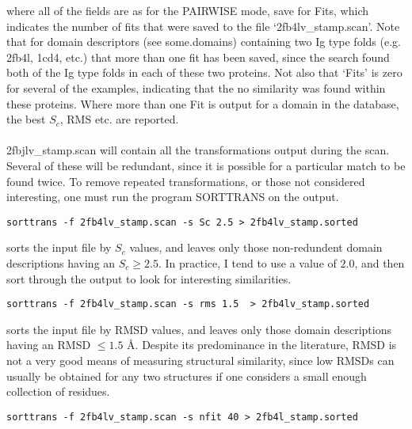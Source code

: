 where all of the fields are as for the PAIRWISE mode, save for Fits, which indicates the 
number of fits that were saved to the file `2fb4lv\_stamp.scan'.  Note that for domain descriptors 
(see some.domains) containing two Ig type folds (e.g. 2fb4l, 1cd4, etc.) that more than
one fit has been saved, since the search found both of the Ig type folds in each of
these two proteins.  Not also that `Fits' is zero for several of the examples,
indicating that the no similarity was found within these proteins.  Where more than one
Fit is output for a domain in the database, the best $S_{c}$, RMS etc. are reported.\\
\\
2fbjlv\_stamp.scan will contain all the transformations output during
the scan.  Several of these will be redundant, since it is possible for a 
particular match to be found twice.  To remove repeated 
transformations, or those not considered interesting, one must run
the program SORTTRANS on the output.\\

\begin{scriptsize}\begin{verbatim}
sorttrans -f 2fb4lv_stamp.scan -s Sc 2.5 > 2fb4lv_stamp.sorted
\end{verbatim} \end{scriptsize}

sorts the input file by $S_{c}$ values, and leaves only those non-redundent 
domain descriptions having an $S_{c} \geq 2.5$.  In practice, I tend to
use a value of $2.0$, and then sort through the output to look for
interesting similarities.  \\

\begin{scriptsize}\begin{verbatim}
sorttrans -f 2fb4lv_stamp.scan -s rms 1.5  > 2fb4lv_stamp.sorted
\end{verbatim} \end{scriptsize}

sorts the input file by RMSD values, and leaves only those domain
descriptions having an RMSD $\leq 1.5$ \AA.  Despite its predominance in
the literature, RMSD is not a very good means of measuring structural 
similarity, since low RMSDs can usually be obtained for any two structures
if one considers a small enough collection of residues.\\


\begin{scriptsize}\begin{verbatim}
sorttrans -f 2fb4lv_stamp.scan -s nfit 40 > 2fb4l_stamp.sorted
\end{verbatim} \end{scriptsize}
 
